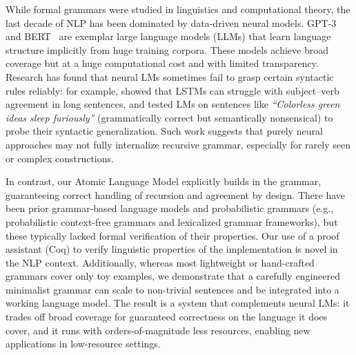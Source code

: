 \documentclass[11pt]{article}
\begin{document}
While formal grammars were studied in linguistics and computational theory, the last decade of NLP has been dominated by data-driven neural models. GPT-3~\cite{brown2020} and BERT~\cite{devlin2019} are exemplar large language models (LLMs) that learn language structure implicitly from huge training corpora. These models achieve broad coverage but at a huge computational cost and with limited transparency. Research has found that neural LMs sometimes fail to grasp certain syntactic rules reliably: for example, \citet{linzen2016} showed that LSTMs can struggle with subject–verb agreement in long sentences, and \citet{gulordava2018} tested LMs on sentences like \textit{``Colorless green ideas sleep furiously''} (grammatically correct but semantically nonsensical) to probe their syntactic generalization. Such work suggests that purely neural approaches may not fully internalize recursive grammar, especially for rarely seen or complex constructions.

In contrast, our Atomic Language Model explicitly builds in the grammar, guaranteeing correct handling of recursion and agreement by design. There have been prior grammar-based language models and probabilistic grammars (e.g., probabilistic context-free grammars and lexicalized grammar frameworks), but these typically lacked formal verification of their properties. Our use of a proof assistant (Coq) to verify linguistic properties of the implementation is novel in the NLP context. Additionally, whereas most lightweight or hand-crafted grammars cover only toy examples, we demonstrate that a carefully engineered minimalist grammar can scale to non-trivial sentences and be integrated into a working language model. The result is a system that complements neural LMs: it trades off broad coverage for guaranteed correctness on the language it does cover, and it runs with orders-of-magnitude less resources, enabling new applications in low-resource settings.
\end{document}
